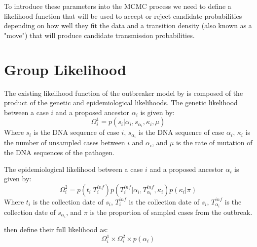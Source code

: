 \documentclass[11pt,a4paper]{report}
\begin{document}
To introduce these parameters into the MCMC process we need to define a likelihood function that will be used to accept or reject candidate probabilities depending on how well they fit the data and a transition density (also known as a "move") that will produce candidate transmission probabilities.

\section{Group Likelihood}
The existing likelihood function of the outbreaker model by \citet{outbrkr} is composed of the product of the genetic and epidemiological likelihoods. The genetic likelihood between a case $i$ and a proposed ancestor $\alpha_i$ is given by:
\begin{equation}
\Omega^{1}_i = p(s_i | \alpha_i , s_{\alpha_i}, \kappa_i, \mu)
\end{equation}
Where $s_i$ is the DNA sequence of case $i$, $s_{\alpha_i}$ is the DNA sequence of case $\alpha_i$, $\kappa_i$ is the number of unsampled cases between $i$ and $\alpha_i$, and $\mu$ is the rate of mutation of the DNA sequences of the pathogen.

The epidemiological likelihood between a case $i$ and a proposed ancestor $\alpha_i$ is given by:
\begin{equation}
\Omega^{2}_i = p(t_i | T^{inf}_i)p(T^{inf}_i | \alpha_i, T^{inf}_{\alpha_i}, \kappa_i)p(\kappa_i | \pi)
\end{equation}
Where $t_i$ is the collection date of $s_i$, $T^{inf}_i$ is the collection date of $s_i$, $T^{inf}_{\alpha_i}$ is the collection date of $s_{\alpha_i}$, and $\pi$ is the proportion of sampled cases from the outbreak.

\citet{outbrkr} then define their full likelihood as:
\begin{equation}
\Omega^{1}_i \times \Omega^{2}_i \times p(\alpha_i)
\end{equation}
\end{document}
